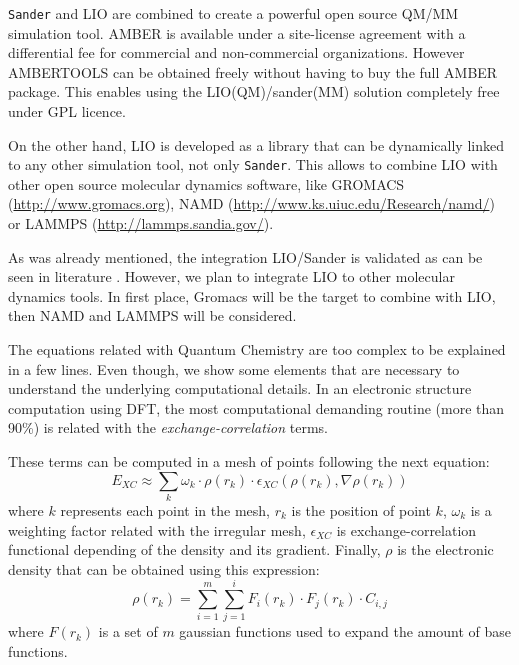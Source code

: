 \documentclass[a4paper,10pt]{article}
\begin{document}
\texttt{Sander} and LIO are combined to create a powerful open source QM/MM simulation tool.
AMBER is available under a site-license agreement with a differential fee for commercial and non-commercial organizations.
However AMBERTOOLS can be obtained freely without having to buy the full AMBER package.
This enables using the LIO(QM)/sander(MM) solution completely free under GPL licence.

On the other hand, LIO is developed as a library that can be dynamically linked to any other simulation tool, not only \texttt{Sander}.
This allows to combine LIO with other open source molecular dynamics software, like GROMACS (\url{http://www.gromacs.org}), NAMD (\url{http://www.ks.uiuc.edu/Research/namd/}) or LAMMPS (\url{http://lammps.sandia.gov/}).

As was already mentioned, the integration LIO/Sander is validated as can be seen in literature . 
However, we plan to integrate LIO to other molecular dynamics tools.
In first place, Gromacs will be the target to combine with LIO, then NAMD and LAMMPS will be considered.

The equations related with Quantum Chemistry are too complex to be explained in a few lines. 
Even though, we show some elements that are necessary to understand the underlying computational details. 
In an electronic structure computation using DFT, the most computational demanding routine (more than 90\%) is related with the \emph{exchange-correlation} terms.

These terms can be computed in a mesh of points following the next equation:
\begin{equation}
    \label{eq:xc}
    E_{XC} \approx \sum_k \omega_k \cdot \rho(r_k) \cdot \epsilon_{XC} \left(\rho(r_k),\nabla \rho(r_k)\right)
\end{equation}
where $k$ represents each point in the mesh, $r_k$ is the position of point $k$, $\omega_k$ is a weighting factor related with the irregular mesh, $\epsilon_{XC}$ is exchange-correlation functional depending of the density and its gradient. 
Finally, $\rho$ is the electronic density that can be obtained using this expression:
\begin{equation}
  \label{eq:rho-xc}
  \rho(r_k) = \sum^m_{i=1} \sum^i_{j=1} F_i(r_k) \cdot F_j(r_k) \cdot C_{i,j}
\end{equation}
where $F(r_k)$ is a set of $m$ gaussian functions used to expand the amount of base functions.
\end{document}
